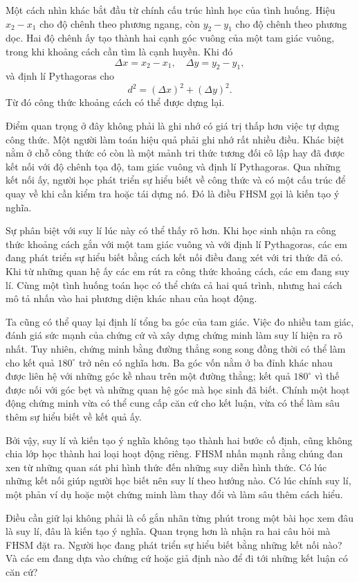 Một cách nhìn khác bắt đầu từ chính cấu trúc hình học của tình huống. Hiệu $x_2-x_1$ cho độ chênh theo phương ngang, còn $y_2-y_1$ cho độ chênh theo phương dọc. Hai độ chênh ấy tạo thành hai cạnh góc vuông của một tam giác vuông, trong khi khoảng cách cần tìm là cạnh huyền. Khi đó
$$
\Delta x=x_2-x_1,\quad \Delta y=y_2-y_1,
$$
và định lí Pythagoras cho
$$
d^2=(\Delta x)^2+(\Delta y)^2.
$$
Từ đó công thức khoảng cách có thể được dựng lại.

Điểm quan trọng ở đây không phải là ghi nhớ có giá trị thấp hơn việc tự dựng công thức. Một người làm toán hiệu quả phải ghi nhớ rất nhiều điều. Khác biệt nằm ở chỗ công thức có còn là một mảnh tri thức tương đối cô lập hay đã được kết nối với độ chênh tọa độ, tam giác vuông và định lí Pythagoras. Qua những kết nối ấy, người học phát triển sự hiểu biết về công thức và có một cấu trúc để quay về khi cần kiểm tra hoặc tái dựng nó. Đó là điều FHSM gọi là kiến tạo ý nghĩa.

Sự phân biệt với suy lí lúc này có thể thấy rõ hơn. Khi học sinh nhận ra công thức khoảng cách gắn với một tam giác vuông và với định lí Pythagoras, các em đang phát triển sự hiểu biết bằng cách kết nối điều đang xét với tri thức đã có. Khi từ những quan hệ ấy các em rút ra công thức khoảng cách, các em đang suy lí. Cùng một tình huống toán học có thể chứa cả hai quá trình, nhưng hai cách mô tả nhấn vào hai phương diện khác nhau của hoạt động.

Ta cũng có thể quay lại định lí tổng ba góc của tam giác. Việc đo nhiều tam giác, đánh giá sức mạnh của chứng cứ và xây dựng chứng minh làm suy lí hiện ra rõ nhất. Tuy nhiên, chứng minh bằng đường thẳng song song đồng thời có thể làm cho kết quả $180^\circ$ trở nên có nghĩa hơn. Ba góc vốn nằm ở ba đỉnh khác nhau được liên hệ với những góc kề nhau trên một đường thẳng; kết quả $180^\circ$ vì thế được nối với góc bẹt và những quan hệ góc mà học sinh đã biết. Chính một hoạt động chứng minh vừa có thể cung cấp căn cứ cho kết luận, vừa có thể làm sâu thêm sự hiểu biết về kết quả ấy.

Bởi vậy, suy lí và kiến tạo ý nghĩa không tạo thành hai bước cố định, cũng không chia lớp học thành hai loại hoạt động riêng. FHSM nhấn mạnh rằng chúng đan xen từ những quan sát phi hình thức đến những suy diễn hình thức. Có lúc những kết nối giúp người học biết nên suy lí theo hướng nào. Có lúc chính suy lí, một phản ví dụ hoặc một chứng minh làm thay đổi và làm sâu thêm cách hiểu.

Điều cần giữ lại không phải là cố gắn nhãn từng phút trong một bài học xem đâu là suy lí, đâu là kiến tạo ý nghĩa. Quan trọng hơn là nhận ra hai câu hỏi mà FHSM đặt ra. Người học đang phát triển sự hiểu biết bằng những kết nối nào? Và các em đang dựa vào chứng cứ hoặc giả định nào để đi tới những kết luận có căn cứ?

